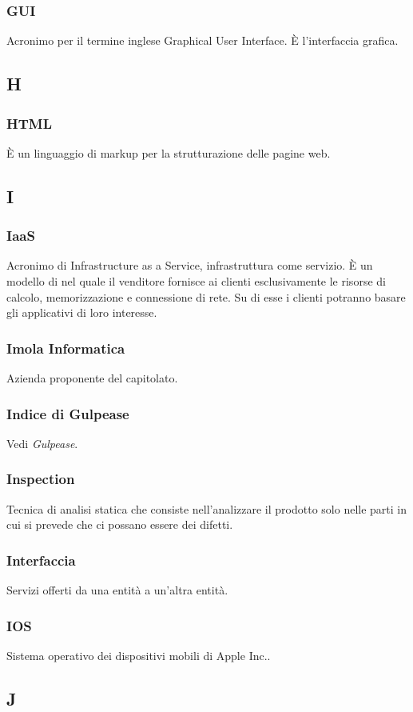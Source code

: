 \subsubsection*{GUI} Acronimo per il termine inglese Graphical User Interface. È l'interfaccia grafica.
\subsection*{H}
\subsubsection*{HTML} È un linguaggio di markup per la strutturazione delle pagine web.
\subsection*{I}
\subsubsection*{IaaS} Acronimo di Infrastructure as a Service, infrastruttura come servizio. È un modello di  nel quale il venditore fornisce ai clienti esclusivamente le risorse di calcolo, memorizzazione e connessione di rete. Su di esse i clienti potranno basare gli applicativi di loro interesse.
\subsubsection*{Imola Informatica} Azienda proponente del capitolato.
\subsubsection*{Indice di Gulpease} Vedi \textit{Gulpease}.
\subsubsection*{Inspection} Tecnica di analisi statica che consiste nell’analizzare il prodotto solo nelle parti in cui si prevede che ci possano essere dei difetti.
\subsubsection*{Interfaccia} Servizi offerti da una entità a un'altra entità.
\subsubsection*{IOS} Sistema operativo dei dispositivi mobili di Apple Inc..
\subsection*{J}
